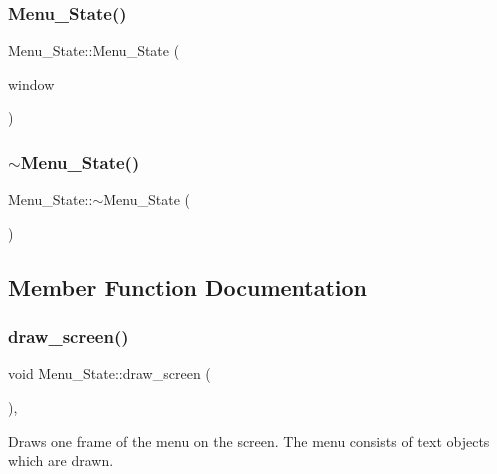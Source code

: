 \subsubsection{\texorpdfstring{Menu\+\_\+\+State()}{Menu\_State()}}
{\footnotesize\ttfamily Menu\+\_\+\+State\+::\+Menu\+\_\+\+State (\begin{DoxyParamCaption}\item[{sf\+::\+Render\+Window $\ast$}]{window }\end{DoxyParamCaption})}

\mbox{\label{classMenu__State_a765dfb5f654ab9698ad24bfa99fa0715}} 
\subsubsection{\texorpdfstring{$\sim$\+Menu\+\_\+\+State()}{~Menu\_State()}}
{\footnotesize\ttfamily Menu\+\_\+\+State\+::$\sim$\+Menu\+\_\+\+State (\begin{DoxyParamCaption}{ }\end{DoxyParamCaption})}



\subsection{Member Function Documentation}
\mbox{\label{classMenu__State_a30c6a5c755eea65e117b6c6772afad27}} 
\subsubsection{\texorpdfstring{draw\+\_\+screen()}{draw\_screen()}}
{\footnotesize\ttfamily void Menu\+\_\+\+State\+::draw\+\_\+screen (\begin{DoxyParamCaption}{ }\end{DoxyParamCaption})\hspace{0.3cm}{\ttfamily [override]}, {\ttfamily [virtual]}}

Draws one frame of the menu on the screen. The menu consists of text objects which are drawn. 

